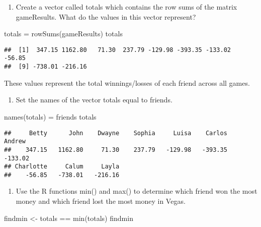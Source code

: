 \documentclass[]{article}
\newenvironment{Shaded}{\begin{snugshade}}{\end{snugshade}}
\newcommand{\FunctionTok}[1]{\textcolor[rgb]{0.00,0.00,0.00}{#1}}
\newcommand{\NormalTok}[1]{#1}
\newcommand{\OtherTok}[1]{\textcolor[rgb]{0.56,0.35,0.01}{#1}}
\newcommand{\SpecialCharTok}[1]{\textcolor[rgb]{0.00,0.00,0.00}{#1}}
\providecommand{\tightlist}{%
  \setlength{\itemsep}{0pt}\setlength{\parskip}{0pt}}
\begin{document}
\begin{enumerate}
\def\labelenumi{(\alph{enumi})}
\setcounter{enumi}{3}
\tightlist
\item
  Create a vector called totals which contains the row sums of the
  matrix gameResults. What do the values in this vector represent?
\end{enumerate}

\begin{Shaded}
\begin{Highlighting}[]
\NormalTok{totals }\OtherTok{=} \FunctionTok{rowSums}\NormalTok{(gameResults)}
\NormalTok{totals}
\end{Highlighting}
\end{Shaded}

\begin{verbatim}
##  [1]  347.15 1162.80   71.30  237.79 -129.98 -393.35 -133.02  -56.85
##  [9] -738.01 -216.16
\end{verbatim}

These values represent the total winnings/losses of each friend across
all games.

\begin{enumerate}
\def\labelenumi{(\alph{enumi})}
\setcounter{enumi}{4}
\tightlist
\item
  Set the names of the vector totals equal to friends.
\end{enumerate}

\begin{Shaded}
\begin{Highlighting}[]
\FunctionTok{names}\NormalTok{(totals) }\OtherTok{=}\NormalTok{ friends}
\NormalTok{totals}
\end{Highlighting}
\end{Shaded}

\begin{verbatim}
##     Betty      John    Dwayne    Sophia     Luisa    Carlos    Andrew 
##    347.15   1162.80     71.30    237.79   -129.98   -393.35   -133.02 
## Charlotte     Calum     Layla 
##    -56.85   -738.01   -216.16
\end{verbatim}

\begin{enumerate}
\def\labelenumi{(\alph{enumi})}
\setcounter{enumi}{5}
\tightlist
\item
  Use the R functions min() and max() to determine which friend won the
  most money and which friend lost the most money in Vegas.
\end{enumerate}

\begin{Shaded}
\begin{Highlighting}[]
\NormalTok{findmin }\OtherTok{\textless{}{-}}\NormalTok{ totals }\SpecialCharTok{==} \FunctionTok{min}\NormalTok{(totals)}
\NormalTok{findmin}
\end{Highlighting}
\end{Shaded}
\end{document}
